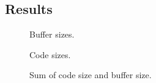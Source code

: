 \subsection{Results}
\label{sec:results:results}

\begin{figure}[t]
\caption{Buffer sizes.}
\end{figure}

\begin{figure}[t]
\caption{Code sizes.}
\end{figure}

\begin{figure}[t]
\caption{Sum of code size and buffer size.}
\end{figure}

